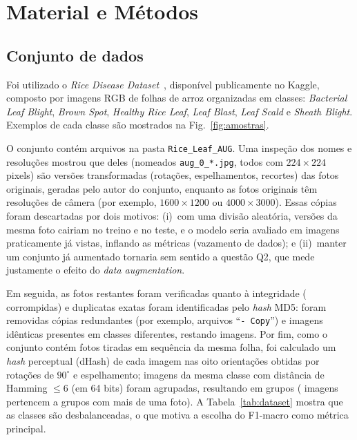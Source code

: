 \documentclass[conference]{IEEEtran}
\begin{document}
\section{Material e Métodos}\label{sec:metodos}

\subsection{Conjunto de dados}
Foi utilizado o \textit{Rice Disease Dataset}~\cite{kaggle_rice}, disponível publicamente no Kaggle, composto por imagens RGB de folhas de arroz organizadas em \NClasses{} classes: \textit{Bacterial Leaf Blight}, \textit{Brown Spot}, \textit{Healthy Rice Leaf}, \textit{Leaf Blast}, \textit{Leaf Scald} e \textit{Sheath Blight}. Exemplos de cada classe são mostrados na Fig.~\ref{fig:amostras}.

O conjunto contém \NTotalFiles{} arquivos na pasta \texttt{Rice\_Leaf\_AUG}. Uma inspeção dos nomes e resoluções mostrou que \NAugExcluded{} deles (nomeados \texttt{aug\_0\_*.jpg}, todos com $224\times224$ pixels) são versões transformadas (rotações, espelhamentos, recortes) das fotos originais, geradas pelo autor do conjunto, enquanto as fotos originais têm resoluções de câmera (por exemplo, $1600\times1200$ ou $4000\times3000$). Essas cópias foram descartadas por dois motivos: (i)~com uma divisão aleatória, versões da mesma foto cairiam no treino e no teste, e o modelo seria avaliado em imagens praticamente já vistas, inflando as métricas (vazamento de dados); e (ii)~manter um conjunto já aumentado tornaria sem sentido a questão Q2, que mede justamente o efeito do \textit{data augmentation}.

Em seguida, as fotos restantes foram verificadas quanto à integridade (\NCorrupt{} corrompidas) e duplicatas exatas foram identificadas pelo \textit{hash} MD5: foram removidas \NDuplicates{} cópias redundantes (por exemplo, arquivos ``\texttt{- Copy}'') e \NConflicting{} imagens idênticas presentes em classes diferentes, restando \NClean{} imagens. Por fim, como o conjunto contém fotos tiradas em sequência da mesma folha, foi calculado um \textit{hash} perceptual (dHash) de cada imagem nas oito orientações obtidas por rotações de $90^\circ$ e espelhamento; imagens da mesma classe com distância de Hamming $\le 6$ (em 64 bits) foram agrupadas, resultando em \NGroups{} grupos (\NNearDup{} imagens pertencem a grupos com mais de uma foto). A Tabela~\ref{tab:dataset} mostra que as classes são desbalanceadas, o que motiva a escolha do F1-macro como métrica principal.
\end{document}
